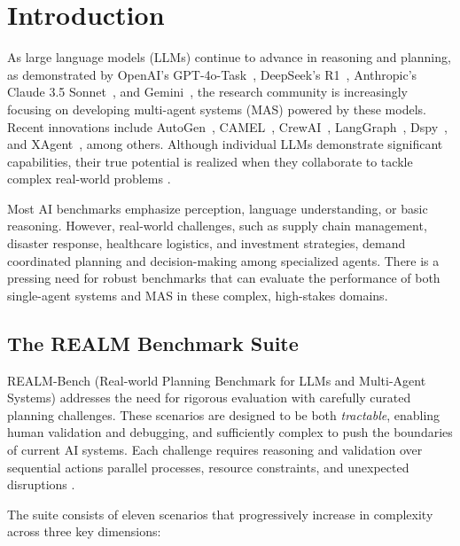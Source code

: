 \section{Introduction}
\label{sec:Intro}

As large language models (LLMs) continue to advance in reasoning and planning, as demonstrated by OpenAI's GPT-4o-Task~\cite{openai2024gpt4o}, DeepSeek's R1~\cite{deepseekai2025deepseekr1}, Anthropic's Claude 3.5 Sonnet~\cite{anthropic2024claude}, and Gemini~\cite{geminiteam2023gemini}, the research community is increasingly focusing on developing multi-agent systems (MAS) powered by these models. Recent innovations include AutoGen~\cite{wu2024autogen}, CAMEL~\cite{li2023camel}, CrewAI~\cite{crewai2024}, LangGraph~\cite{langgraph2024}, Dspy~\cite{khattab2023dspy}, and XAgent~\cite{xia2023xagent}, among others. 
Although individual LLMs demonstrate significant capabilities, their true potential is realized when they collaborate
to tackle complex real-world problems \cite{AGIBookChang2024}.

Most AI benchmarks emphasize perception, language understanding, or basic reasoning. However, real-world challenges, such as supply chain management, disaster response, healthcare logistics, and investment strategies, demand coordinated planning and decision-making among specialized agents. There is a pressing need for robust benchmarks that can evaluate the performance of both single-agent systems and MAS in these complex, high-stakes domains.

\subsection{The REALM Benchmark Suite}

REALM-Bench (Real-world Planning Benchmark for LLMs and Multi-Agent Systems) addresses the need for rigorous evaluation with carefully curated planning challenges. These scenarios are designed to be both \textit{tractable}, enabling human validation and debugging, and sufficiently complex to push the boundaries of current AI systems. Each challenge requires reasoning and validation over sequential actions
parallel processes, resource constraints, and unexpected disruptions
\cite{chang2025MACI,SocraSynthChangCSCI2023,SocraticIEEECCWC2023,chen-etal-2024-llmarena, huang2024understandingplanningllmagents}.

The suite consists of eleven scenarios that progressively increase in complexity across three key dimensions:

